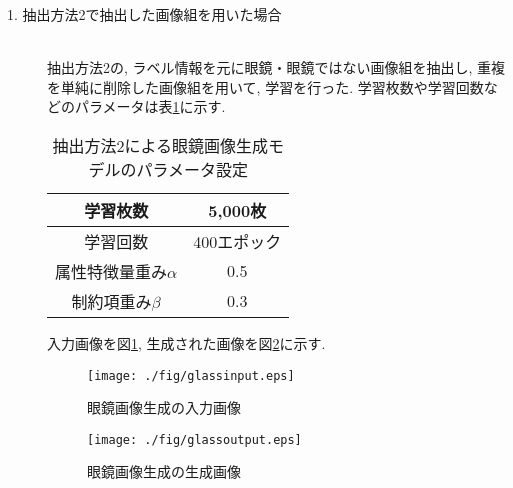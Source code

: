 \begin{description}
 \item[1. 抽出方法2で抽出した画像組を用いた場合]\mbox{}\\ 
抽出方法2の, ラベル情報を元に眼鏡・眼鏡ではない画像組を抽出し, 重複を単純に削除した画像組を用いて, 学習を行った. 学習枚数や学習回数などのパラメータは表\ref{tab:glassparam}に示す. 
\begin{table}[H]
  \begin{center}
    \caption{抽出方法2による眼鏡画像生成モデルのパラメータ設定}
    \begin{tabular}{|c|c|} \hline
      学習枚数 & 5,000枚  \\ \hline
      学習回数 & 400エポック  \\ \hline
      属性特徴量重み$\alpha$ & 0.5  \\ \hline
      制約項重み$\beta$ & 0.3  \\ \hline
    \end{tabular}
    \label{tab:glassparam}
  \end{center}
\end{table}

入力画像を図\ref{fig:glassinput}, 生成された画像を図\ref{fig:glassoutput}に示す. 

\begin{figure}[H]
 	\begin{center}
 		\texttt{[image: ./fig/glassinput.eps]}
 		\caption{眼鏡画像生成の入力画像}
 		\label{fig:glassinput}
 	\end{center}
\end{figure}
\begin{figure}[H]
 	\begin{center}
 		\texttt{[image: ./fig/glassoutput.eps]}
 		\caption{眼鏡画像生成の生成画像}
 		\label{fig:glassoutput}
 	\end{center}
\end{figure}

\end{description}
